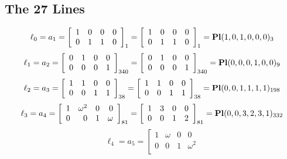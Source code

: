 \documentclass{article}
\begin{document}
{\subsection*{The 27 Lines}
$$
\ell_{0} = a_{1} = 
\left[
\begin{array}{*{4}{r}}
1 & 0 & 0 & 0\\
0 & 1 & 1 & 0\\
\end{array}
\right]
_{1}
=
\left[
\begin{array}{*{4}c}
1  & 0  & 0  & 0\\
0  & 1  & 1  & 0\\
\end{array}
\right]_{1}
={\rm\bf Pl}(1,0,1,0,0,0 )_{3}$$
$$
\ell_{1} = a_{2} = 
\left[
\begin{array}{*{4}{r}}
0 & 1 & 0 & 0\\
0 & 0 & 0 & 1\\
\end{array}
\right]
_{340}
=
\left[
\begin{array}{*{4}c}
0  & 1  & 0  & 0\\
0  & 0  & 0  & 1\\
\end{array}
\right]_{340}
={\rm\bf Pl}(0,0,0,1,0,0 )_{9}$$
$$
\ell_{2} = a_{3} = 
\left[
\begin{array}{*{4}{r}}
1 & 1 & 0 & 0\\
0 & 0 & 1 & 1\\
\end{array}
\right]
_{38}
=
\left[
\begin{array}{*{4}c}
1  & 1  & 0  & 0\\
0  & 0  & 1  & 1\\
\end{array}
\right]_{38}
={\rm\bf Pl}(0,0,1,1,1,1 )_{198}$$
$$
\ell_{3} = a_{4} = 
\left[
\begin{array}{*{4}{r}}
1 & \omega^{2} & 0 & 0\\
0 & 0 & 1 & \omega \\
\end{array}
\right]
_{81}
=
\left[
\begin{array}{*{4}c}
1  & 3  & 0  & 0\\
0  & 0  & 1  & 2\\
\end{array}
\right]_{81}
={\rm\bf Pl}(0,0,3,2,3,1 )_{332}$$
$$
\ell_{4} = a_{5} = 
\left[
\begin{array}{*{4}{r}}
1 & \omega  & 0 & 0\\
0 & 0 & 1 & \omega^{2}\\

\end{array}$$}
\end{document}
